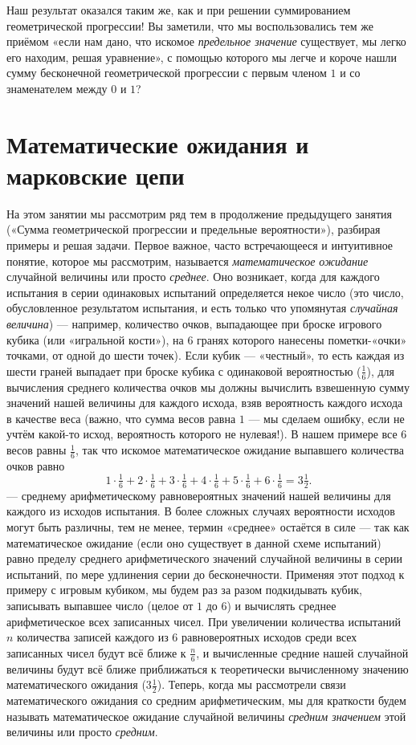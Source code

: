 \documentclass{article}
\begin{document}
Наш результат оказался таким же, как и при решении суммированием геометрической прогрессии! 
Вы заметили, что мы воспользовались тем же приёмом «если нам дано, что искомое \emph{предельное значение} существует, 
мы легко его находим, решая уравнение», с помощью которого мы легче и короче нашли сумму бесконечной геометрической прогрессии с первым членом $1$ и со знаменателем между $0$ и $1$?

\section{Математические ожидания и марковские цепи}

На этом занятии мы рассмотрим ряд тем в продолжение предыдущего занятия («Сумма геометрической прогрессии и предельные вероятности»), разбирая примеры и решая задачи. 
Первое важное, часто встречающееся и интуитивное понятие, которое мы рассмотрим, называется \emph{математическое ожидание} случайной величины или просто \emph{среднее}. 
Оно возникает, когда для каждого испытания в серии одинаковых испытаний определяется некое число (это число, обусловленное результатом испытания, и есть только что упомянутая \emph{случайная величина}) --- например, количество очков, выпадающее при броске игрового кубика (или «игральной кости»), на $6$ гранях которого нанесены пометки-«очки» точками, от одной до шести точек). 
Если кубик --- «честный», 
то есть каждая из шести граней выпадает при броске кубика с одинаковой вероятностью ($\tfrac16$), для вычисления среднего количества очков мы должны вычислить взвешенную сумму значений нашей величины для каждого исхода, взяв вероятность каждого исхода в качестве веса (важно, что сумма весов равна $1$ --- мы сделаем ошибку, если не учтём какой-то исход, вероятность которого не нулевая!). 
В нашем примере все $6$ весов равны $\tfrac16$, так что искомое математическое ожидание выпавшего количества очков равно
\[1\cdot\tfrac16+2\cdot\tfrac16+3\cdot\tfrac16+4\cdot\tfrac16+5\cdot\tfrac16+6\cdot\tfrac16=3\tfrac12.\]
--- среднему арифметическому равновероятных значений нашей величины для каждого из исходов испытания. 
В более сложных случаях вероятности исходов могут быть различны, тем не менее, термин «среднее» остаётся в силе --- так как математическое ожидание (если оно существует в данной схеме испытаний) равно пределу среднего арифметического значений случайной величины в серии испытаний, по мере удлинения серии до бесконечности. 
Применяя этот подход к примеру с игровым кубиком, мы будем раз за разом подкидывать кубик, записывать выпавшее число (целое от $1$ до $6$) и вычислять среднее арифметическое всех записанных чисел. 
При увеличении количества испытаний $n$ 
количества записей каждого 
из $6$ равновероятных исходов среди всех записанных чисел 
будут всё ближе к $\tfrac{n}6$, 
и вычисленные средние нашей случайной величины будут всё ближе приближаться к теоретически вычисленному значению математического ожидания ($3\tfrac12$). 
Теперь, когда мы рассмотрели связи математического ожидания со средним арифметическим, мы для краткости будем называть математическое ожидание случайной величины \emph{средним значением} этой величины или просто \emph{средним}.
\end{document}
